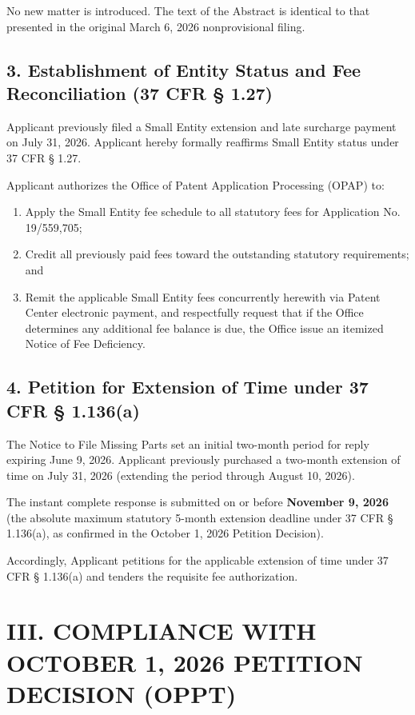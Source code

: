 \documentclass[11pt,letterpaper]{article}
\begin{document}
No new matter is introduced. The text of the Abstract is identical to that presented in the original March 6, 2026 nonprovisional filing.

\subsection*{3. Establishment of Entity Status and Fee Reconciliation (37 CFR \S{} 1.27)}

Applicant previously filed a Small Entity extension and late surcharge payment on July 31, 2026. Applicant hereby formally reaffirms Small Entity status under 37 CFR \S{} 1.27. 

Applicant authorizes the Office of Patent Application Processing (OPAP) to:
\begin{enumerate}[label=(\alph*), leftmargin=2em, itemsep=2pt, parsep=0pt]
    \item Apply the Small Entity fee schedule to all statutory fees for Application No. 19/559,705;
    \item Credit all previously paid fees toward the outstanding statutory requirements; and
    \item Remit the applicable Small Entity fees concurrently herewith via Patent Center electronic payment, and respectfully request that if the Office determines any additional fee balance is due, the Office issue an itemized Notice of Fee Deficiency.
\end{enumerate}

\subsection*{4. Petition for Extension of Time under 37 CFR \S{} 1.136(a)}

The Notice to File Missing Parts set an initial two-month period for reply expiring June 9, 2026. Applicant previously purchased a two-month extension of time on July 31, 2026 (extending the period through August 10, 2026). 

The instant complete response is submitted on or before \textbf{November 9, 2026} (the absolute maximum statutory 5-month extension deadline under 37 CFR \S{} 1.136(a), as confirmed in the October 1, 2026 Petition Decision). 

Accordingly, Applicant petitions for the applicable extension of time under 37 CFR \S{} 1.136(a) and tenders the requisite fee authorization.

\newpage

\section*{III. COMPLIANCE WITH OCTOBER 1, 2026 PETITION DECISION (OPPT)}
\end{document}
